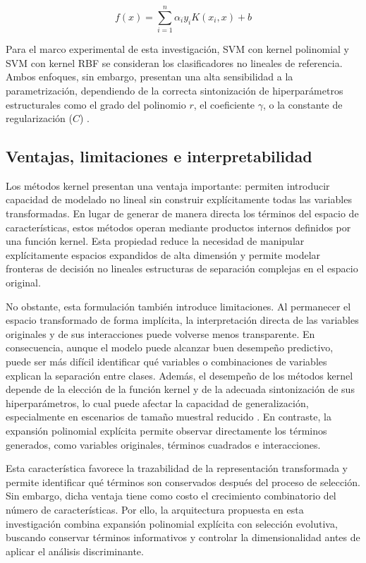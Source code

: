 \begin{equation}
	f(x) = \sum_{i = 1}^{n} {\alpha_iy_iK(x_i,x) + b}
	\label{eq:EMT19}
\end{equation}

Para el marco experimental de esta investigación, SVM con kernel polinomial y SVM con kernel RBF se consideran los clasificadores no lineales de referencia. Ambos enfoques, sin embargo, presentan una alta sensibilidad a la parametrización, dependiendo de la correcta sintonización de hiperparámetros estructurales como el grado del polinomio $r$, el coeficiente $\gamma$, o la constante de regularización ($C$) \cite{chapelle2002choosing}.

\subsection{Ventajas, limitaciones e interpretabilidad}

Los métodos kernel presentan una ventaja importante: permiten introducir capacidad de modelado no lineal sin construir explícitamente todas las variables transformadas. En lugar de generar de manera directa los términos del espacio de características, estos métodos operan mediante productos internos definidos por una función kernel. Esta propiedad reduce la necesidad de manipular explícitamente espacios expandidos de alta dimensión y permite modelar fronteras de decisión no lineales estructuras de separación complejas en el espacio original.

No obstante, esta formulación también introduce limitaciones. Al permanecer el espacio transformado de forma implícita, la interpretación directa de las variables originales y de sus interacciones puede volverse menos transparente. En consecuencia, aunque el modelo puede alcanzar buen desempeño predictivo, puede ser más difícil identificar qué variables o combinaciones de variables explican la separación entre clases. Además, el desempeño de los métodos kernel depende de la elección de la función kernel y de la adecuada sintonización de sus hiperparámetros, lo cual puede afectar la capacidad de generalización, especialmente
en escenarios de tamaño muestral reducido \cite{chapelle2002choosing} \cite{rudin2019stop}. En contraste, la expansión polinomial explícita permite observar directamente los términos generados, como variables originales, términos cuadrados e interacciones. 

Esta característica favorece la trazabilidad de la representación transformada y permite identificar qué términos son conservados después del proceso de selección. Sin embargo, dicha ventaja tiene como costo el crecimiento combinatorio del número de características. Por ello, la arquitectura propuesta en esta investigación combina expansión polinomial explícita con selección evolutiva, buscando conservar términos informativos y controlar la dimensionalidad antes de aplicar el análisis discriminante.

